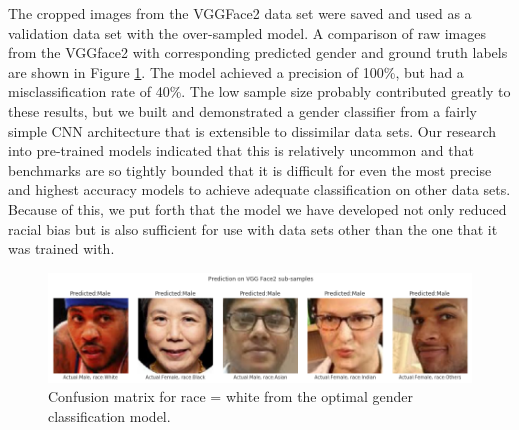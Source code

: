 \documentclass[obeyspaces, spaces, fleqn,10pt]{SelfArx} %
\begin{document}
The cropped images from the VGGFace2 data set were saved and used as a validation data set with the over-sampled model. A comparison of raw images from the VGGface2 with corresponding predicted gender and ground truth labels are shown in Figure \ref{fig:fig8}. The model achieved a precision of 100\%, but had a misclassification rate of 40\%. The low sample size probably contributed greatly to these results, but we built and demonstrated a gender classifier from a fairly simple CNN architecture that is extensible to dissimilar data sets. Our research into pre-trained models indicated that this is relatively uncommon and that benchmarks are so tightly bounded that it is difficult for even the most precise and highest accuracy models to achieve adequate classification on other data sets. Because of this, we put forth that the model we have developed not only reduced racial bias but is also sufficient for use with data sets other than the one that it was trained with.

\begin{figure}[ht]\centering %
\includegraphics[width=.95\linewidth]{img/VGG_facelabels}
\caption{Confusion matrix for race = white from the optimal gender classification model.}
\label{fig:fig8}
\end{figure}
\end{document}
